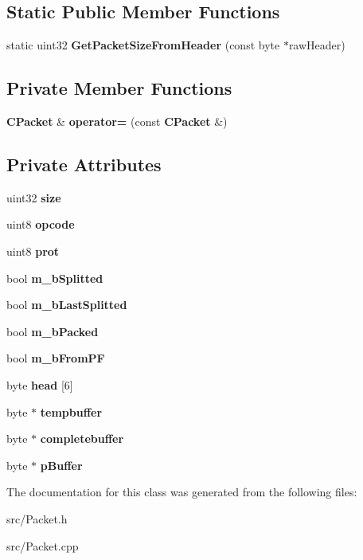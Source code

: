 \subsection*{Static Public Member Functions}
\begin{DoxyCompactItemize}
\item 
static uint32 {\bfseries GetPacketSizeFromHeader} (const byte $\ast$rawHeader)\label{classCPacket_a5d5cf519636999024b073b2f7561bd20}

\end{DoxyCompactItemize}
\subsection*{Private Member Functions}
\begin{DoxyCompactItemize}
\item 
{\bf CPacket} \& {\bf operator=} (const {\bf CPacket} \&)\label{classCPacket_abdfba5feebd2712bdf5f2691a800107b}

\end{DoxyCompactItemize}
\subsection*{Private Attributes}
\begin{DoxyCompactItemize}
\item 
uint32 {\bfseries size}\label{classCPacket_acbffdfd1a59233f4d1f02da817b9ecae}

\item 
uint8 {\bfseries opcode}\label{classCPacket_aae8e1b94f86be2d636d3fbf001401300}

\item 
uint8 {\bfseries prot}\label{classCPacket_ac859f9f52d227cab919eab809350a1a7}

\item 
bool {\bfseries m\_\-bSplitted}\label{classCPacket_a1a6a9ff336c2595fba2b57730b954ffb}

\item 
bool {\bfseries m\_\-bLastSplitted}\label{classCPacket_a81a864df41db88501e4b66326b216464}

\item 
bool {\bfseries m\_\-bPacked}\label{classCPacket_abb0ef4464d6558b646b12de0ca57351d}

\item 
bool {\bfseries m\_\-bFromPF}\label{classCPacket_ab77c08e62b5663944daf6208ab575038}

\item 
byte {\bfseries head} [6]\label{classCPacket_adec453ca0fb2aa6dd54fa8a331b848ca}

\item 
byte $\ast$ {\bfseries tempbuffer}\label{classCPacket_ab5d0425e42d31babd4b9446ccf7060c4}

\item 
byte $\ast$ {\bfseries completebuffer}\label{classCPacket_ab4b66839f03d61be009d52a0ccadeaec}

\item 
byte $\ast$ {\bfseries pBuffer}\label{classCPacket_a9979fb6b44a0c497e3c7d309b74ebc87}

\end{DoxyCompactItemize}


The documentation for this class was generated from the following files:\begin{DoxyCompactItemize}
\item 
src/Packet.h\item 
src/Packet.cpp\end{DoxyCompactItemize}
